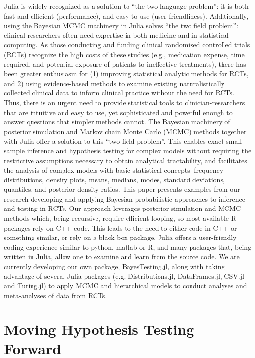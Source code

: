 \documentclass{juliacon}
\begin{document}
Julia is widely recognized as a solution to “the two-language problem”: it is both fast and efficient (performance), and easy to use (user friendliness)\cite{bezanson2017julia}.  Additionally, using the Bayesian MCMC machinery in Julia solves “the two field problem”: clinical researchers often need expertise in both medicine and in statistical computing. As those conducting and funding clinical randomized controlled trials (RCTs) recognize the high costs of these studies (e.g., medication expense, time required, and potential exposure of patients to ineffective treatments), there has been greater enthusiasm for (1) improving statistical analytic methods for RCTs, and 2) using evidence-based methods to examine existing naturalistically collected clinical data to inform clinical practice without the need for RCTs. Thus, there is an urgent need to provide statistical tools to clinician-researchers that are intuitive and easy to use, yet sophisticated and powerful enough to answer questions that simpler methods cannot.
\vskip 6pt
The Bayesian machinery of posterior simulation and Markov chain Monte Carlo (MCMC) methods together with Julia offer a solution to this “two-field problem”. This enables exact small sample inference and hypothesis testing for complex models without requiring the restrictive assumptions necessary to obtain analytical tractability, and facilitates the analysis of complex models with basic statistical concepts: frequency distributions, density plots, means, medians, modes, standard deviations, quantiles, and posterior density ratios\cite{Mills2019}. 
\vskip 6pt
This paper presents examples from our research developing and applying Bayesian probabilistic approaches to inference and testing in RCTs\cite{Mills2019, Strawn2019, Strawn2018, Strawn2017, Strawn2018a}. Our approach leverages posterior simulation and MCMC methods which, being recursive, require efficient looping, so most available R packages rely on C++ code.  This leads to the need to either code in C++ or something similar, or rely on a black box package.  Julia offers a user-friendly coding experience similar to python, matlab or R, and many packages that, being written in Julia, allow one to examine and learn from the source code.  We are currently developing our own package, BayesTesting.jl\cite{Mills2018}, along with taking advantage of several Julia packages (e.g. Distributions.jl, DataFrames.jl, CSV.jl and Turing.jl) to apply MCMC and hierarchical models to conduct analyses and meta-analyses of data from RCTs\cite{Strawn2019}.

\section{Moving Hypothesis Testing Forward}
\label{sec:hypothesistest}
\end{document}
